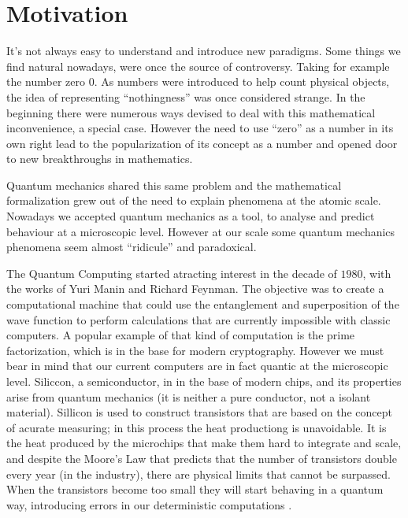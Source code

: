 \section{Motivation}
\label{sec:int_motivation}



It's not always easy to understand and introduce new paradigms. Some things we find natural nowadays, were once the source of controversy. Taking for example the number zero $0$. As numbers were introduced to help count physical objects, the idea of representing ``nothingness'' was once considered strange. In the beginning there were numerous ways devised to deal with this mathematical inconvenience, a special case. However the need to use ``zero'' as a number in its own right lead to the popularization of its concept as a number and opened door to new breakthroughs in mathematics\cite{Kaplan2000}. 

Quantum mechanics shared this same problem and the mathematical formalization grew out of the need to explain phenomena at the atomic scale\cite{Mehra1982}. Nowadays we  accepted quantum mechanics as a tool, to analyse and predict behaviour at a microscopic level. However at our scale some quantum mechanics phenomena seem almost ``ridicule'' and paradoxical.

The Quantum Computing started atracting interest in the decade of $1980$, with the works of Yuri Manin and Richard Feynman. The objective was to create a computational machine that could use the entanglement and superposition of the wave function to perform calculations that are currently impossible with classic computers. A popular example of that kind of computation is the prime factorization, which is in the base for modern cryptography. 
However we must bear in mind that our current computers are in fact quantic at the microscopic level. 
Siliccon, a semiconductor, in in the base of modern chips, and its properties arise from quantum mechanics (it is neither a pure conductor, not a isolant material). Sillicon is used to construct transistors that are based on the concept of acurate measuring; in this process the heat productiong is unavoidable. It is the heat produced by the microchips that make them hard to integrate and scale, and despite the Moore's Law that predicts that the number of transistors double every year (in the industry), there are physical limits that cannot be surpassed. When the transistors become too small they will start behaving in a quantum way, introducing errors in our deterministic computations \cite{Laughlin2005}.

